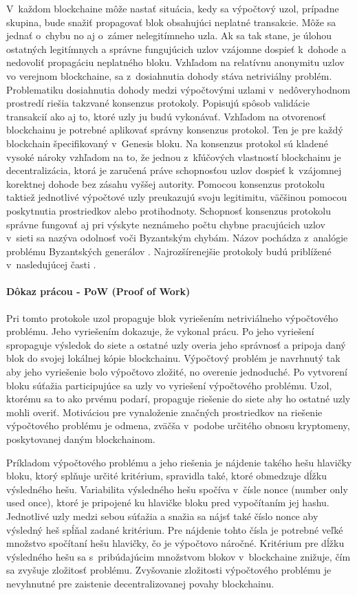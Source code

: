 V~každom blockchaine môže nastať situácia, kedy sa výpočtový uzol, prípadne skupina, bude snažiť propagovať blok obsahujúci neplatné transakcie. Môže sa jednať o~chybu no aj o~zámer nelegitímneho uzla. Ak sa tak stane, je úlohou ostatných legitímnych a správne fungujúcich uzlov vzájomne dospieť k~dohode a nedovoliť propagáciu neplatného bloku. Vzhľadom na relatívnu anonymitu uzlov vo verejnom blockchaine, sa z~dosiahnutia dohody stáva netriviálny problém. Problematiku dosiahnutia dohody medzi výpočtovými uzlami v~nedôveryhodnom prostredí riešia takzvané konsenzus protokoly. Popisujú spôsob validácie transakcií ako aj to, ktoré uzly ju budú vykonávať. Vzhľadom na otvorenosť blockchainu je potrebné aplikovať správny konsenzus protokol. Ten je pre každý blockchain špecifikovaný v~Genesis bloku. Na konsenzus protokol sú kladené vysoké nároky vzhľadom na to, že jednou z~kľúčových vlastností blockchainu je decentralizácia, ktorá je zaručená práve schopnosťou uzlov dospieť k~vzájomnej korektnej dohode bez zásahu vyššej autority. Pomocou konsenzus protokolu taktiež jednotlivé výpočtové uzly preukazujú svoju legitimitu, väčšinou pomocou poskytnutia prostriedkov alebo protihodnoty. Schopnosť konsenzus protokolu správne fungovať aj pri výskyte neznámeho počtu chybne pracujúcich uzlov v~sieti sa nazýva odolnosť voči Byzantským chybám. Názov pochádza z~analógie problému Byzantských generálov \cite{byznatine_generals}. Najrozšírenejšie protokoly budú priblížené v~nasledujúcej časti \cite{blockchain_consensus}.

\paragraph{Dôkaz prácou - PoW (Proof of Work)}

Pri tomto protokole uzol propaguje blok vyriešením netriviálneho výpočtového problému. Jeho vyriešením dokazuje, že vykonal prácu. Po jeho vyriešení spropaguje výsledok do siete a ostatné uzly overia jeho správnosť a pripoja daný blok do svojej lokálnej kópie blockchainu. Výpočtový problém je navrhnutý tak aby jeho vyriešenie bolo výpočtovo zložité, no overenie jednoduché. Po vytvorení bloku súťažia participujúce sa uzly vo vyriešení výpočtového problému. Uzol, ktorému sa to ako prvému podarí, propaguje riešenie do siete aby ho ostatné uzly mohli overiť. Motiváciou pre vynaloženie značných prostriedkov na riešenie výpočtového problému je odmena, zväčša v~podobe určitého obnosu kryptomeny, poskytovanej daným blockchainom.

Príkladom výpočtového problému a jeho riešenia je nájdenie takého hešu hlavičky bloku, ktorý splňuje určité kritérium, spravidla také, ktoré obmedzuje dĺžku výsledného hešu. Variabilita výsledného hešu spočíva v~čísle nonce (number only used once), ktoré je pripojené ku hlavičke bloku pred vypočítaním jej hashu. Jednotlivé uzly medzi sebou súťažia a snažia sa nájsť také číslo nonce aby výsledný heš spĺňal zadané kritérium. Pre nájdenie tohto čísla je potrebné veľké množstvo spočítaní hešu hlavičky, čo je výpočtovo náročné. Kritérium pre dĺžku výsledného hešu sa s~pribúdajúcim množstvom blokov v~blockchaine znižuje, čím sa zvyšuje zložitosť problému. Zvyšovanie zložitosti výpočtového problému je nevyhnutné pre zaistenie decentralizovanej povahy blockchainu.

